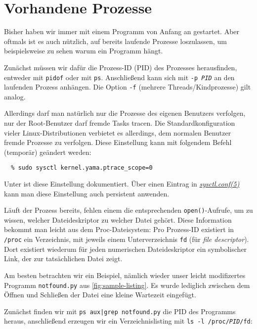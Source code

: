 \section{Vorhandene Prozesse}

Bisher haben wir \strace{} immer mit einem Programm von Anfang an gestartet. Aber oftmals
ist es auch nützlich, \strace{} auf bereits laufende Prozesse loszulassen, um beispielsweise zu
sehen warum ein Programm hängt.

Zunächst müssen wir dafür die Prozess-ID (PID) des Prozesses herausfinden, entweder mit
\texttt{pidof} oder mit \texttt{ps}. Anschließend kann sich \strace{} mit \texttt{-p \emph{PID}}
an den laufenden Prozess anhängen. Die Option \texttt{-f} (mehrere Threads/Kindprozesse) gilt
analog.


Allerdings darf man natürlich nur die Prozesse des eigenen Benutzers verfolgen, nur der
Root-Benutzer darf fremde Tasks tracen. Die Standardkonfiguration vieler Linux-Distributionen
verbietet es allerdings, dem normalen Benutzer fremde Prozesse zu verfolgen. Diese Einstellung
kann mit folgendem Befehl (temporär) geändert werden:

\begin{lstlisting}
  % sudo sysctl kernel.yama.ptrace_scope=0
\end{lstlisting}

Unter \cite{yama} ist diese Einstellung dokumentiert. Über einen Eintrag in
\href{http://man7.org/linux/man-pages/man5/sysctl.conf.5.html}{\emph{sysctl.conf(5)}} kann man
diese Einstellung auch persistent anwenden.



Läuft der Prozess bereits, fehlen einem die entsprechenden \texttt{open()}-Aufrufe, um zu wissen,
welcher Dateideskriptor zu welcher Datei gehört. Diese Information bekommt man leicht aus dem
Proc-Dateisystem: Pro Prozess-ID existiert in \texttt{/proc} ein Verzeichnis, mit jeweils einem
Unterverzeichnis \texttt{fd} (für \emph{file descriptor}). Dort existiert wiederum für jeden
numerischen Dateideskriptor ein symbolischer Link, der zur tatsächlichen Datei zeigt.

Am besten betrachten wir ein Beispiel, nämlich wieder unser leicht modifizertes Programm
\texttt{notfound.py} aus \autoref{fig:sample-listing}. Es wurde lediglich zwischen dem Öffnen
und Schließen der Datei eine kleine Wartezeit eingefügt.

Zunächst finden wir mit \texttt{ps aux|grep notfound.py} die PID des Programms heraus, anschließend
erzeugen wir ein Verzeichnislisting mit \texttt{ls -l /proc/\emph{PID}/fd}:


